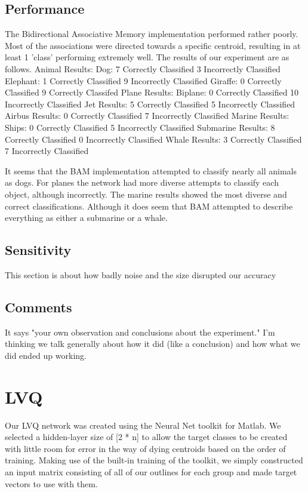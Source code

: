 \documentclass{article}
\begin{document}
\subsection{Performance}
The Bidirectional Associative Memory implementation performed rather poorly.
Most of the associations were directed towards a specific centroid, resulting
in at least 1 'class' performing extremely well. The results of our
experiment are as follows.
Animal Results:
    Dog:
        7 Correctly Classified
        3 Incorrectly Classified
    Elephant:
        1 Correctly Classified
        9 Incorrectly Classified
    Giraffe:
        0 Correctly Classified
        9 Correctly Classifed
Plane Results:
    Biplane:
        0 Correctly Classified
        10 Incorrectly Classified
    Jet Results:
        5 Correctly Classified
        5 Incorrectly Classified
    Airbus Results:
        0 Correctly Classified
        7 Incorrectly Classified
Marine Results:
    Ships:
        0 Correctly Classified
        5 Incorrectly Classified
    Submarine Results:
        8 Correctly Classified
        0 Incorrectly Classified
    Whale Results:
        3 Correctly Classified
        7 Incorrectly Classified

It seems that the BAM implementation attempted to classify nearly all animals
as dogs. For planes the network had more diverse attempts to classify each
object, although incorrectly. The marine results showed the most diverse and
correct classifications. Although it does seem that BAM attempted to describe
everything as either a submarine or a whale.

\subsection{Sensitivity}
This section is about how badly noise and the size disrupted our accuracy

\subsection{Comments}
It says "your own observation and conclusions about the experiment."
I'm thinking we talk generally about how it did (like a conclusion) and how
what we did ended up working.




\section{LVQ}
Our LVQ network was created using the Neural Net toolkit for Matlab. We selected a hidden-layer size of [2 * n] to allow the target classes to be created with little room for error in the way of dying centroids based on the order of training. Making use of the built-in training of the toolkit, we simply constructed an input matrix consisting of all of our outlines for each group and made target vectors to use with them. 
\end{document}
